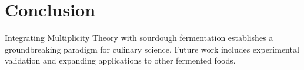 \documentclass{article}
\theoremstyle{plain}
\begin{document}
\section{Conclusion}
Integrating Multiplicity Theory with sourdough fermentation establishes a groundbreaking paradigm for culinary science. Future work includes experimental validation and expanding applications to other fermented foods.



\nocite{*}


\end{document}
